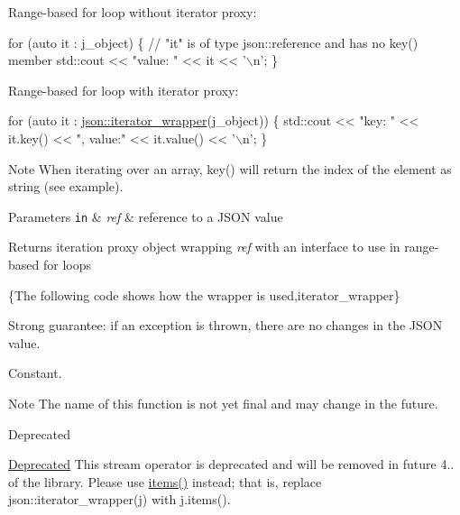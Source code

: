 Range-\/based for loop without iterator proxy\+:


\begin{DoxyCode}
\textcolor{keywordflow}{for} (\textcolor{keyword}{auto} it : j\_object)
\{
    \textcolor{comment}{// "it" is of type json::reference and has no key() member}
    std::cout << \textcolor{stringliteral}{"value: "} << it << \textcolor{charliteral}{'\(\backslash\)n'};
\}
\end{DoxyCode}


Range-\/based for loop with iterator proxy\+:


\begin{DoxyCode}
\textcolor{keywordflow}{for} (\textcolor{keyword}{auto} it : \hyperlink{classnlohmann_1_1basic__json_a5e4212986136ca1220f351c60e89906b}{json::iterator\_wrapper}(j\_object))
\{
    std::cout << \textcolor{stringliteral}{"key: "} << it.key() << \textcolor{stringliteral}{", value:"} << it.value() << \textcolor{charliteral}{'\(\backslash\)n'};
\}
\end{DoxyCode}


\begin{DoxyNote}{Note}
When iterating over an array, {\ttfamily key()} will return the index of the element as string (see example).
\end{DoxyNote}

\begin{DoxyParams}[1]{Parameters}
\mbox{\tt in}  & {\em ref} & reference to a J\+S\+ON value \\
\hline
\end{DoxyParams}
\begin{DoxyReturn}{Returns}
iteration proxy object wrapping {\itshape ref} with an interface to use in range-\/based for loops
\end{DoxyReturn}
\{The following code shows how the wrapper is used,iterator\+\_\+wrapper\}

Strong guarantee\+: if an exception is thrown, there are no changes in the J\+S\+ON value.

Constant.

\begin{DoxyNote}{Note}
The name of this function is not yet final and may change in the future.
\end{DoxyNote}
\begin{DoxyRefDesc}{Deprecated}
\item[\hyperlink{deprecated__deprecated000001}{Deprecated}]This stream operator is deprecated and will be removed in future 4.. of the library. Please use \hyperlink{classnlohmann_1_1basic__json_afe3e137ace692efa08590d8df40f58dd}{items()} instead; that is, replace {\ttfamily json\+::iterator\+\_\+wrapper(j)} with {\ttfamily j.\+items()}. \end{DoxyRefDesc}


